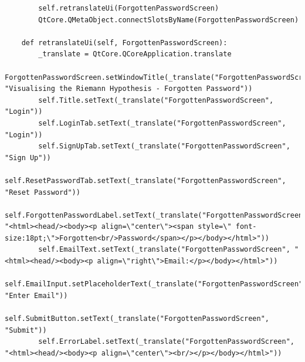 \documentclass{article}
\begin{document}
\begin{lstlisting}
        self.retranslateUi(ForgottenPasswordScreen)
        QtCore.QMetaObject.connectSlotsByName(ForgottenPasswordScreen)

    def retranslateUi(self, ForgottenPasswordScreen):
        _translate = QtCore.QCoreApplication.translate
        ForgottenPasswordScreen.setWindowTitle(_translate("ForgottenPasswordScreen", "Visualising the Riemann Hypothesis - Forgotten Password"))
        self.Title.setText(_translate("ForgottenPasswordScreen", "Login"))
        self.LoginTab.setText(_translate("ForgottenPasswordScreen", "Login"))
        self.SignUpTab.setText(_translate("ForgottenPasswordScreen", "Sign Up"))
        self.ResetPasswordTab.setText(_translate("ForgottenPasswordScreen", "Reset Password"))
        self.ForgottenPasswordLabel.setText(_translate("ForgottenPasswordScreen", "<html><head/><body><p align=\"center\"><span style=\" font-size:18pt;\">Forgotten<br/>Password</span></p></body></html>"))
        self.EmailText.setText(_translate("ForgottenPasswordScreen", "<html><head/><body><p align=\"right\">Email:</p></body></html>"))
        self.EmailInput.setPlaceholderText(_translate("ForgottenPasswordScreen", "Enter Email"))
        self.SubmitButton.setText(_translate("ForgottenPasswordScreen", "Submit"))
        self.ErrorLabel.setText(_translate("ForgottenPasswordScreen", "<html><head/><body><p align=\"center\"><br/></p></body></html>"))
\end{lstlisting}
\end{document}
